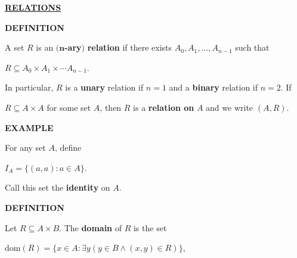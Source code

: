 \documentclass[12pt, a4paper]{article}
\begin{document}
\vspace{10mm}

\begin{flushleft}

\textbf{\large{\underline{RELATIONS}}}

\vspace{8mm}

\blacksquare \textbf{ DEFINITION}

\end{flushleft}

A set $R$ is an $(\mathbf{n}$\textbf{-ary}$)$ \textbf{relation} if there exists $A_0,A_1,\dots,A_{n-1}$ such that\par

\vspace{4mm}

\centerline{$R\subseteq A_0\times A_1\times\cdots A_{n-1}$.}

\vspace{4mm}

In particular, $R$ is a \textbf{unary} relation if $n=1$ and a \textbf{binary} relation if $n=2$. If\par$R\subseteq A\times A$ for some set $A$, then $R$ is a \textbf{relation on} $A$ and we write $(A,R)$.

\begin{flushleft}

\blacksquare \textbf{ EXAMPLE}

\end{flushleft}

For any set $A$, define\par

\vspace{4mm}

\centerline{$I_A=\{(a,a)\colon a\in A\}$.}

\vspace{4mm}

Call this set the \textbf{identity} on $A$. 

\begin{flushleft}

\blacksquare \textbf{ DEFINITION}

\end{flushleft}

Let $R\subseteq A\times B$. The \textbf{domain} of $R$ is the set\par

\vspace{4mm}

\centerline{dom$(R)=\{x\in A\colon\exists y(y\in B\wedge(x,y)\in R)\}$,}
\end{document}
